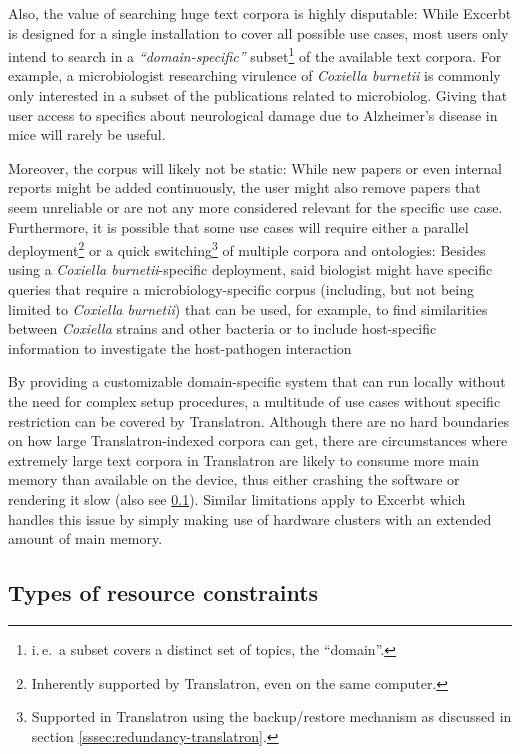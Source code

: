 \documentclass[a4paper, 12pt, twoside, reqn]{report}
\numberwithin{figure}{chapter}
\newtheorem[L]{boxedDefinition}{Definition}
\newtheorem[L]{boxedExample}{Example}
\newcommand{\ie}{i.\,e.\ }
\newcommand{\itquote}[1]{\textit{{``}#1{''}}}
\begin{document}
Also, the value of searching huge text corpora is highly disputable: While Excerbt is designed for a single installation to cover all possible use cases, most users only intend to search in a \itquote{domain-specific} subset\footnote{\ie a subset covers a distinct set of topics, the ``domain''.} of the available text corpora. For example, a microbiologist researching virulence of \textit{Coxiella burnetii} is commonly only interested in a subset of the publications related to microbiolog. Giving that user access to specifics about neurological damage due to Alzheimer's disease in mice will rarely be useful.

Moreover, the corpus will likely not be static: While new papers or even internal reports might be added continuously, the user might also remove papers that seem unreliable or are not any more considered relevant for the specific use case. Furthermore, it is possible that some use cases will require either a parallel deployment\footnote{Inherently supported by Translatron, even on the same computer.} or a quick switching\footnote{Supported in Translatron using the backup/restore mechanism as discussed in section \ref{sssec:redundancy-translatron}.} of multiple corpora and ontologies: Besides using a \textit{Coxiella burnetii}-specific deployment, said biologist might have specific queries that require a microbiology-specific corpus (including, but not being limited to \textit{Coxiella burnetii}) that can be used, for example, to find similarities between \textit{Coxiella} strains and other bacteria or to include host-specific information to investigate the host-pathogen interaction

By providing a customizable domain-specific system that can run locally without the need for complex setup procedures, a multitude of use cases without specific restriction can be covered by Translatron. Although there are no hard boundaries on how large Translatron-indexed corpora can get, there are circumstances where extremely large text corpora in Translatron are likely to consume more main memory than available on the device, thus either crashing the software or rendering it slow (also see \ref{ssec:resource-constraints}). Similar limitations apply to Excerbt which handles this issue by simply making use of hardware clusters with an extended amount of main memory.

\subsection{Types of resource constraints}\label{ssec:resource-constraints}
\end{document}
